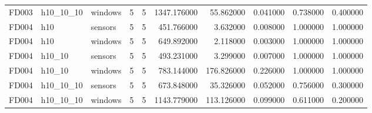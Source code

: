 \begin{table}
\begin{tabular}{lllrrrrrrr}
FD003 & h10_10_10 & windows & 5 & 5 & 1347.176000 & 55.862000 & 0.041000 & 0.738000 & 0.400000 \\
FD004 & h10 & sensors & 5 & 5 & 451.766000 & 3.632000 & 0.008000 & 1.000000 & 1.000000 \\
FD004 & h10 & windows & 5 & 5 & 649.892000 & 2.118000 & 0.003000 & 1.000000 & 1.000000 \\
FD004 & h10_10 & sensors & 5 & 5 & 493.231000 & 3.299000 & 0.007000 & 1.000000 & 1.000000 \\
FD004 & h10_10 & windows & 5 & 5 & 783.144000 & 176.826000 & 0.226000 & 1.000000 & 1.000000 \\
FD004 & h10_10_10 & sensors & 5 & 5 & 673.848000 & 35.326000 & 0.052000 & 0.756000 & 0.300000 \\
FD004 & h10_10_10 & windows & 5 & 5 & 1143.779000 & 113.126000 & 0.099000 & 0.611000 & 0.200000 \\
\bottomrule
\end{tabular}
\end{table}
